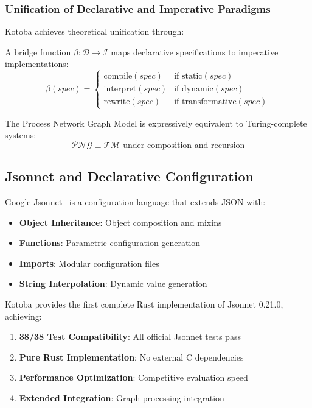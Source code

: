 \documentclass[11pt,a4paper]{article}
\begin{document}
\subsubsection{Unification of Declarative and Imperative Paradigms}
\label{subsubsec:paradigm_unification}

Kotoba achieves theoretical unification through:

\begin{definition}
A bridge function $\beta: \mathcal{D} \rightarrow \mathcal{I}$ maps declarative specifications to imperative implementations:
\[
\beta(spec) = \left\{\begin{array}{ll}
\text{compile}(spec) & \text{if } \text{static}(spec) \\
\text{interpret}(spec) & \text{if } \text{dynamic}(spec) \\
\text{rewrite}(spec) & \text{if } \text{transformative}(spec)
\end{array}\right.
\]
\end{definition}

\begin{theorem}
The Process Network Graph Model is expressively equivalent to Turing-complete systems:
\[
\mathcal{PNG} \equiv \mathcal{TM} \text{ under composition and recursion}
\]
\end{theorem}

\subsection{Jsonnet and Declarative Configuration}
\label{subsec:jsonnet}

Google Jsonnet~\cite{jsonnet} is a configuration language that extends JSON with:
\begin{itemize}
\item \textbf{Object Inheritance}: Object composition and mixins
\item \textbf{Functions}: Parametric configuration generation
\item \textbf{Imports}: Modular configuration files
\item \textbf{String Interpolation}: Dynamic value generation
\end{itemize}

Kotoba provides the first complete Rust implementation of Jsonnet 0.21.0, achieving:
\begin{enumerate}
\item \textbf{38/38 Test Compatibility}: All official Jsonnet tests pass
\item \textbf{Pure Rust Implementation}: No external C dependencies
\item \textbf{Performance Optimization}: Competitive evaluation speed
\item \textbf{Extended Integration}: Graph processing integration
\end{enumerate}
\end{document}
